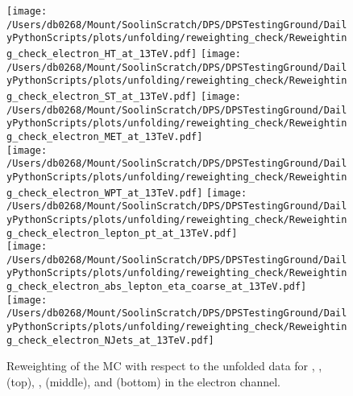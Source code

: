 \begin{figure*}[htpb]
	\centering
	\texttt{[image: /Users/db0268/Mount/SoolinScratch/DPS/DPSTestingGround/DailyPythonScripts/plots/unfolding/reweighting\_check/Reweighting\_check\_electron\_HT\_at\_13TeV.pdf]}
	\texttt{[image: /Users/db0268/Mount/SoolinScratch/DPS/DPSTestingGround/DailyPythonScripts/plots/unfolding/reweighting\_check/Reweighting\_check\_electron\_ST\_at\_13TeV.pdf]}
	\texttt{[image: /Users/db0268/Mount/SoolinScratch/DPS/DPSTestingGround/DailyPythonScripts/plots/unfolding/reweighting\_check/Reweighting\_check\_electron\_MET\_at\_13TeV.pdf]} \\
	\texttt{[image: /Users/db0268/Mount/SoolinScratch/DPS/DPSTestingGround/DailyPythonScripts/plots/unfolding/reweighting\_check/Reweighting\_check\_electron\_WPT\_at\_13TeV.pdf]}
	\texttt{[image: /Users/db0268/Mount/SoolinScratch/DPS/DPSTestingGround/DailyPythonScripts/plots/unfolding/reweighting\_check/Reweighting\_check\_electron\_lepton\_pt\_at\_13TeV.pdf]} \\
	\texttt{[image: /Users/db0268/Mount/SoolinScratch/DPS/DPSTestingGround/DailyPythonScripts/plots/unfolding/reweighting\_check/Reweighting\_check\_electron\_abs\_lepton\_eta\_coarse\_at\_13TeV.pdf]} 
	\texttt{[image: /Users/db0268/Mount/SoolinScratch/DPS/DPSTestingGround/DailyPythonScripts/plots/unfolding/reweighting\_check/Reweighting\_check\_electron\_NJets\_at\_13TeV.pdf]}
	\caption[Reweighting of the \PowhegPythia{} MC with respect to the unfolded data for \HT{}, \ST{}, \MET{} (top), \WPT{}, \LPT{} (middle), \LETA{} and \NJET{} (bottom) in the electron channel.]{Reweighting of the \PowhegPythia{} MC with respect to the unfolded data for \HT{}, \ST{}, \MET{} (top), \WPT{}, \LPT{} (middle), \LETA{} and \NJET{} (bottom) in the electron channel.}
	\label{fig:Reweightingse}
\end{figure*}

